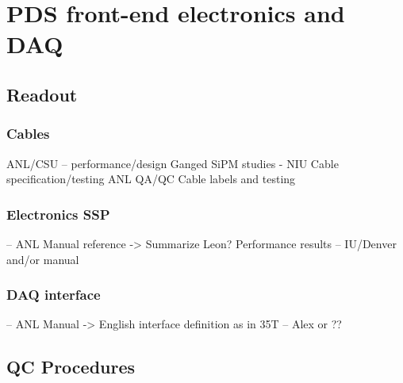 






\section{PDS front-end electronics and DAQ}

\subsection{Readout}

\subsubsection{Cables}
     ANL/CSU -- performance/design 
     Ganged SiPM studies - NIU
     Cable specification/testing ANL
     QA/QC Cable labels and testing

\subsubsection{Electronics SSP}
      -- ANL Manual reference -> Summarize  Leon?
     Performance results -- IU/Denver and/or manual

\subsubsection{DAQ interface}
      -- ANL Manual -> English 
     interface definition as in 35T  -- Alex or ??

\subsection{QC Procedures}
